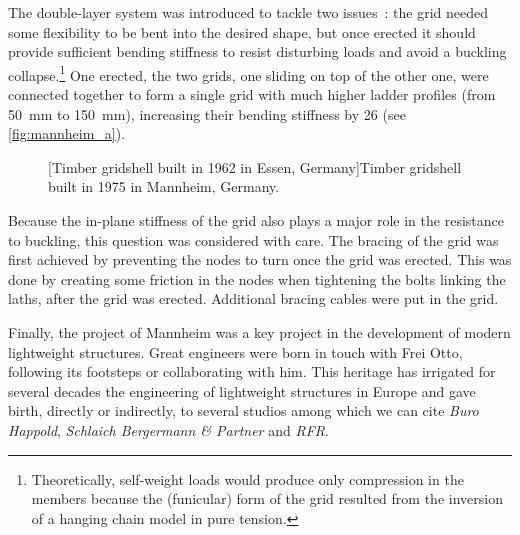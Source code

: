 The double-layer system was introduced to tackle two issues~: the grid needed some flexibility to be bent into the desired shape, but once erected it should provide sufficient bending stiffness to resist disturbing loads and avoid a buckling collapse.\footnote{Theoretically, self-weight loads would produce only compression in the members because the (funicular) form of the grid resulted from the inversion of a hanging chain model in pure tension.} One erected, the two grids, one sliding on top of the other one, were connected together to form a single grid with much higher ladder profiles (from \SI{50}{mm} to \SI{150}{mm}), increasing their bending stiffness by 26 (see \cref{fig:mannheim_a}).
\begin{figure}[t]
		\hspace*{\fill}
		\vspace{10pt}
		[Timber gridshell built in 1962 in Essen, Germany]{Timber gridshell built in 1975 in Mannheim, Germany.}
		\label{fig:mannheim}    
\end{figure}

Because the in-plane stiffness of the grid also plays a major role in the resistance to buckling, this question was considered with care. The bracing of the grid was first achieved by preventing the nodes to turn once the grid was erected. This was done by creating some friction in the nodes when tightening the bolts linking the laths, after the grid was erected. Additional bracing cables were put in the grid.

Finally, the project of Mannheim was a key project in the development of modern lightweight structures. Great engineers were born in touch with Frei Otto, following its footsteps or collaborating with him. This heritage has irrigated for several decades the engineering of lightweight structures in Europe and gave birth, directly or indirectly, to several studios among which we can cite \emph{Buro Happold}, \emph{Schlaich Bergermann \& Partner} and \emph{RFR}.

